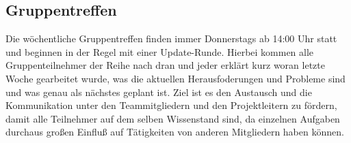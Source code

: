 \subsection{Gruppentreffen}
Die w{\"o}chentliche Gruppentreffen finden immer Donnerstags ab 14:00 Uhr statt und beginnen in der Regel mit einer Update-Runde. Hierbei kommen alle Gruppenteilnehmer der Reihe nach dran und jeder erkl{\"a}rt kurz woran letzte Woche gearbeitet wurde, was die aktuellen Herausfoderungen und Probleme sind und was genau als n{\"a}chstes geplant ist. Ziel ist es den Austausch und die Kommunikation unter den Teammitgliedern und den Projektleitern zu f{\"o}rdern, damit alle Teilnehmer auf dem selben Wissenstand sind, da einzelnen Aufgaben durchaus gro{\ss}en Einflu{\ss} auf T{\"a}tigkeiten von anderen Mitgliedern haben k{\"o}nnen. \\